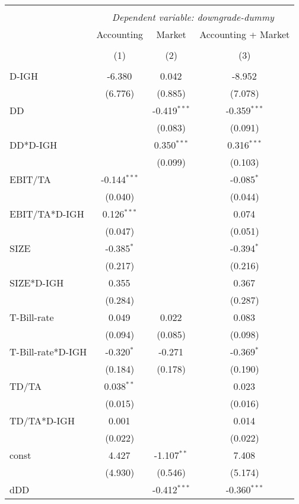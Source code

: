 \begin{table}[!htbp] \centering
\begin{tabular}{@{\extracolsep{5pt}}lccc}
\\[-1.8ex]\hline
\hline \\[-1.8ex]
& \multicolumn{3}{c}{\textit{Dependent variable: downgrade-dummy}} \
\cr \cline{2-4}
\\[-1.8ex] & \multicolumn{1}{c}{Accounting} & \multicolumn{1}{c}{Market} & \multicolumn{1}{c}{Accounting + Market}  \\
\\[-1.8ex] & (1) & (2) & (3) \\
\hline \\[-1.8ex]
 D-IGH & -6.380$^{}$ & 0.042$^{}$ & -8.952$^{}$ \\
& (6.776) & (0.885) & (7.078) \\
 DD & & -0.419$^{***}$ & -0.359$^{***}$ \\
& & (0.083) & (0.091) \\
 DD*D-IGH & & 0.350$^{***}$ & 0.316$^{***}$ \\
& & (0.099) & (0.103) \\
 EBIT/TA & -0.144$^{***}$ & & -0.085$^{*}$ \\
& (0.040) & & (0.044) \\
 EBIT/TA*D-IGH & 0.126$^{***}$ & & 0.074$^{}$ \\
& (0.047) & & (0.051) \\
 SIZE & -0.385$^{*}$ & & -0.394$^{*}$ \\
& (0.217) & & (0.216) \\
 SIZE*D-IGH & 0.355$^{}$ & & 0.367$^{}$ \\
& (0.284) & & (0.287) \\
 T-Bill-rate & 0.049$^{}$ & 0.022$^{}$ & 0.083$^{}$ \\
& (0.094) & (0.085) & (0.098) \\
 T-Bill-rate*D-IGH & -0.320$^{*}$ & -0.271$^{}$ & -0.369$^{*}$ \\
& (0.184) & (0.178) & (0.190) \\
 TD/TA & 0.038$^{**}$ & & 0.023$^{}$ \\
& (0.015) & & (0.016) \\
 TD/TA*D-IGH & 0.001$^{}$ & & 0.014$^{}$ \\
& (0.022) & & (0.022) \\
 const & 4.427$^{}$ & -1.107$^{**}$ & 7.408$^{}$ \\
& (4.930) & (0.546) & (5.174) \\
 dDD & & -0.412$^{***}$ & -0.360$^{***}$ \\

\end{tabular}
\end{table}
